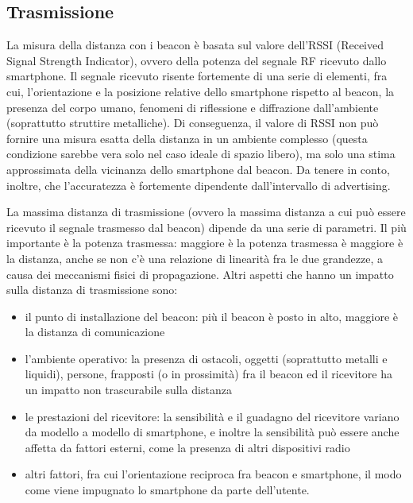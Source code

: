 \subsection{Trasmissione}
La misura della distanza con i beacon è basata sul valore dell'RSSI (Received Signal Strength Indicator), ovvero della potenza del segnale RF ricevuto dallo smartphone. 
Il segnale ricevuto risente fortemente di una serie di elementi, fra cui, l'orientazione e la posizione relative dello smartphone rispetto al beacon, la presenza del corpo umano, fenomeni di riflessione e diffrazione dall'ambiente (soprattutto struttire metalliche).
Di conseguenza, il valore di RSSI non può fornire una misura esatta della distanza in un ambiente complesso (questa condizione sarebbe vera solo nel caso ideale di spazio libero), ma solo una stima approssimata della vicinanza dello smartphone dal beacon. 
Da tenere in conto, inoltre, che l'accuratezza è fortemente dipendente dall'intervallo di advertising. 

La massima distanza di trasmissione (ovvero la massima distanza a cui può essere ricevuto il segnale trasmesso dal beacon) dipende da una serie di parametri. 
Il più importante è la potenza trasmessa: maggiore è la potenza trasmessa è maggiore è la distanza, anche se non c'è una relazione di linearità fra le due grandezze, a causa dei meccanismi fisici di propagazione. 
Altri aspetti che hanno un impatto sulla distanza di trasmissione sono:
\begin{itemize}
\item il punto di installazione del beacon: più il beacon è posto in alto, maggiore è la distanza di comunicazione
\item l'ambiente operativo: la presenza di ostacoli, oggetti (soprattutto metalli e liquidi), persone, frapposti (o in prossimità) fra il beacon ed il ricevitore ha un impatto non trascurabile sulla distanza
\item le prestazioni del ricevitore: la sensibilità e il guadagno del ricevitore variano da modello a modello di smartphone, e inoltre la sensibilità può essere anche affetta da fattori esterni, come la presenza di altri dispositivi radio
\item altri fattori, fra cui l'orientazione reciproca fra beacon e smartphone, il modo come viene impugnato lo smartphone da parte dell'utente.
\end{itemize}

